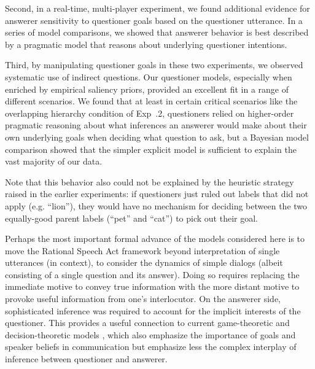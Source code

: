 \documentclass[12pt, floatsintext, jou]{apa6}
\begin{document}
Second, in a real-time, multi-player experiment, we found additional evidence for answerer sensitivity to questioner goals based on the questioner utterance. In a series of model comparisons, we showed that answerer behavior is best described by a pragmatic model that reasons about underlying questioner intentions. %

Third, by manipulating questioner goals in these two experiments, we observed systematic use of indirect questions. Our questioner models, especially when enriched by empirical saliency priors, provided an excellent fit in a range of different scenarios. We found that at least in certain critical scenarios like the overlapping hierarchy condition of Exp~.2, questioners relied on higher-order pragmatic reasoning about what inferences an answerer would make about their own underlying goals when deciding what question to ask, but a Bayesian model comparison showed that the simpler explicit model is sufficient to explain the vast majority of our data.


 Note that this behavior also could not be explained by the heuristic strategy raised in the earlier experiments: if questioners just ruled out labels that did not apply (e.g. ``lion''), they would have no mechanism for deciding between the two equally-good parent labels (``pet'' and ``cat'') to pick out their goal. 

Perhaps the most important formal advance of the models considered here is to move the Rational Speech Act framework beyond interpretation of single utterances (in context), to consider the dynamics of simple dialogs (albeit consisting of a single question and its answer). 
Doing so requires replacing the immediate motive to convey true information with the more distant motive to provoke useful information from one's interlocutor. On the answerer side, sophisticated inference was required to account for the implicit interests of the questioner. This provides a useful connection to current game-theoretic and decision-theoretic models \cite{VogelBodoiaPottsJurafsky13_GricePOMDP, VanRooy03_QuestioningDecisionProblems}, which also emphasize the importance of goals and speaker beliefs in communication but emphasize less the complex interplay of inference between questioner and answerer.
\end{document}
